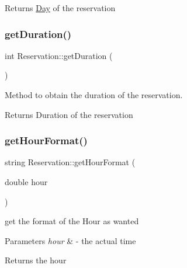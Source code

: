\begin{DoxyReturn}{Returns}
\mbox{\hyperlink{class_day}{Day}} of the reservation 
\end{DoxyReturn}
\mbox{\label{class_reservation_a9d91ef1230af46952cb5422ae769bfa1}} 
\subsubsection{\texorpdfstring{get\+Duration()}{getDuration()}}
{\footnotesize\ttfamily int Reservation\+::get\+Duration (\begin{DoxyParamCaption}{ }\end{DoxyParamCaption})}



Method to obtain the duration of the reservation. 

\begin{DoxyReturn}{Returns}
Duration of the reservation 
\end{DoxyReturn}
\mbox{\label{class_reservation_a36aa0b30371103b07aa331b33e6109d1}} 
\subsubsection{\texorpdfstring{get\+Hour\+Format()}{getHourFormat()}}
{\footnotesize\ttfamily string Reservation\+::get\+Hour\+Format (\begin{DoxyParamCaption}\item[{double}]{hour }\end{DoxyParamCaption})}



get the format of the Hour as wanted 


\begin{DoxyParams}{Parameters}
{\em hour} & -\/ the actual time \\
\hline
\end{DoxyParams}
\begin{DoxyReturn}{Returns}
the hour 
\end{DoxyReturn}
\mbox{\label{class_reservation_adbc454654e7e861d80c8740f85e0fb10}} 

